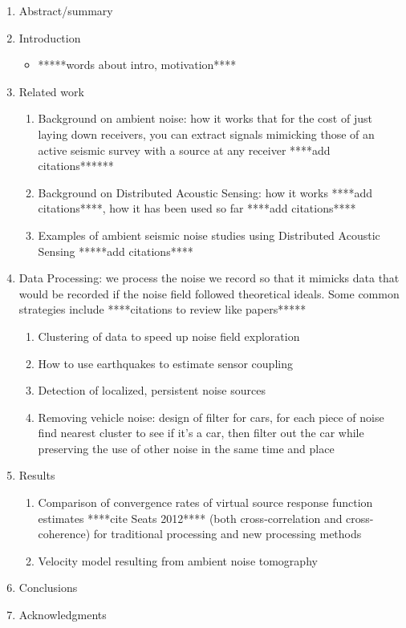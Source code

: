 \documentclass[11pt]{article}
\begin{document}
	\begin{enumerate}
	\item Abstract/summary
	\item Introduction 
		\begin{itemize}
		\item *****words about intro, motivation****
		\end{itemize}
	\item Related work
		\begin{enumerate}
		\item Background on ambient noise: how it works that for the cost of just laying down receivers, you can extract signals mimicking those of an active seismic survey with a source at any receiver ****add citations******
		\item Background on Distributed Acoustic Sensing: how it works ****add citations****, how it has been used so far ****add citations****
		\item Examples of ambient seismic noise studies using Distributed Acoustic Sensing *****add citations****
		\end{enumerate}
	\item Data Processing: we process the noise we record so that it mimicks data that would be recorded if the noise field followed theoretical ideals. Some common strategies include ****citations to review like papers*****
		\begin{enumerate}
		\item Clustering of data to speed up noise field exploration
		\item How to use earthquakes to estimate sensor coupling 
		\item Detection of localized, persistent noise sources 
		\item Removing vehicle noise: design of filter for cars, for each piece of noise find nearest cluster to see if it's a car, then filter out the car while preserving the use of other noise in the same time and place
		\end{enumerate}
	\item Results
		\begin{enumerate}
		\item Comparison of convergence rates of virtual source response function estimates ****cite Seats 2012**** (both cross-correlation and cross-coherence) for traditional processing and new processing methods
		\item Velocity model resulting from ambient noise tomography
		\end{enumerate}
	\item Conclusions
	\item Acknowledgments
	\end{enumerate}
\end{document}
